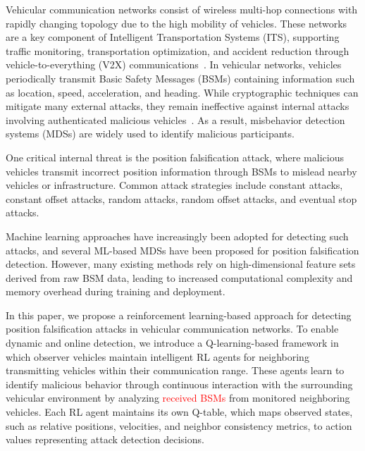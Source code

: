 \documentclass[conference]{IEEEtran}
\begin{document}
Vehicular communication networks consist of wireless multi-hop connections with rapidly changing topology due to the high mobility of vehicles. These networks are a key component of Intelligent Transportation Systems (ITS), supporting traffic monitoring, transportation optimization, and accident reduction through vehicle-to-everything (V2X) communications~\cite{I1}. In vehicular networks, vehicles periodically transmit Basic Safety Messages (BSMs) containing information such as location, speed, acceleration, and heading. While cryptographic techniques can mitigate many external attacks, they remain ineffective against internal attacks involving authenticated malicious vehicles~\cite{I2}. As a result, misbehavior detection systems (MDSs) are widely used to identify malicious participants.

One critical internal threat is the position falsification attack, where malicious vehicles transmit incorrect position information through BSMs to mislead nearby vehicles or infrastructure. Common attack strategies include constant attacks, constant offset attacks, random attacks, random offset attacks, and eventual stop attacks.

Machine learning approaches have increasingly been adopted for detecting such attacks, and several ML-based MDSs have been proposed for position falsification detection. However, many existing methods rely on high-dimensional feature sets derived from raw BSM data, leading to increased computational complexity and memory overhead during training and deployment.


In this paper, we propose a reinforcement learning-based approach for detecting position falsification attacks in vehicular communication networks. To enable dynamic and online detection, we introduce a Q-learning-based framework in which observer vehicles maintain intelligent RL agents for neighboring transmitting vehicles within their communication range. These agents learn to identify malicious behavior through continuous interaction with the surrounding vehicular environment by analyzing \textcolor{red}{received BSMs} from monitored neighboring vehicles. Each RL agent maintains its own Q-table, which maps observed states, such as relative positions, velocities, and neighbor consistency metrics, to action values representing attack detection decisions.
\end{document}
